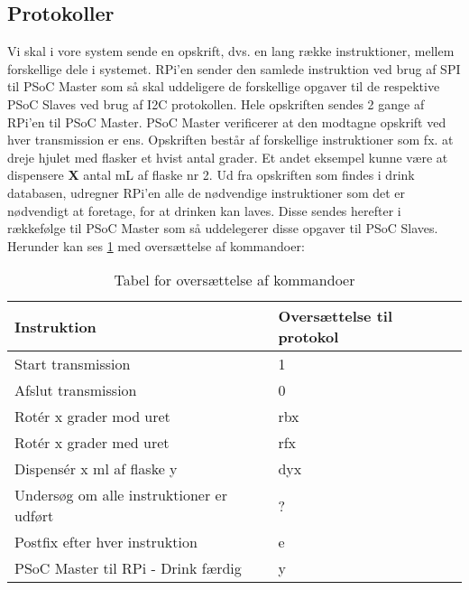 \subsection{Protokoller}
Vi skal i vore system sende en opskrift, dvs. en lang række instruktioner, mellem forskellige dele i systemet. RPi'en sender den samlede instruktion ved brug af SPI til PSoC Master som så skal uddeligere de forskellige opgaver til de respektive PSoC Slaves ved brug af I2C protokollen. Hele opskriften sendes 2 gange af RPi'en til PSoC Master. PSoC Master verificerer at den modtagne opskrift ved hver transmission er ens. Opskriften består af forskellige instruktioner som fx. at dreje hjulet med flasker et hvist antal grader. Et andet eksempel kunne være at dispensere \textbf{X} antal mL af flaske nr 2. Ud fra opskriften som findes i drink databasen, udregner RPi'en alle de nødvendige instruktioner som det er nødvendigt at foretage, for at drinken kan laves. Disse sendes herefter i rækkefølge til PSoC Master som så uddelegerer disse opgaver til PSoC Slaves. Herunder kan ses \ref{tab:protokolTabel} med oversættelse af kommandoer:
\begin{table}[H]
\begin{tabular}{|l|l|}
\hline
Instruktion                              & Oversættelse til protokol \\ \hline
Start transmission                       & 1                         \\ \hline
Afslut transmission                      & 0                         \\ \hline
Rotér x grader mod uret                  & rbx                       \\ \hline
Rotér x grader med uret                  & rfx                       \\ \hline
Dispensér x ml af flaske y               & dyx                       \\ \hline
Undersøg om alle instruktioner er udført & ?                         \\ \hline
Postfix efter hver instruktion            & e                         \\ \hline
PSoC Master til RPi - Drink færdig       & y                         \\ \hline
\end{tabular}
\caption{Tabel for oversættelse af kommandoer}
\label{tab:protokolTabel}
\end{table}

